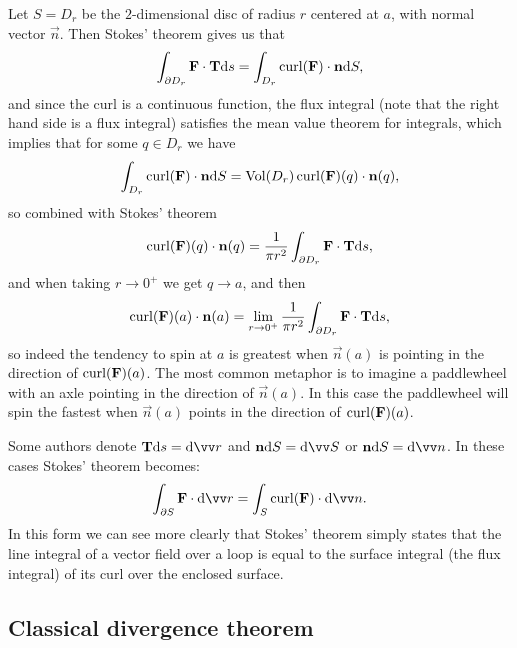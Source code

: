 \documentclass[11pt,a4paper]{article}
\begin{document}
\begin{example}
  Let $S = D_r$ be the $2$-dimensional disc of radius $r$ centered
  at $a$, with normal vector $\vec n$.
  Then Stokes' theorem gives us that
  \[
    \int_{\partial D_r} \boldsymbol{\mathbf{F}} \cdot \boldsymbol{\mathbf{T}} \mathrm{d} s =
    \int_{D_r} \operatorname{curl}(\boldsymbol{\mathbf{F}}) \cdot \boldsymbol{\mathbf{n}} \mathrm{d} S,
  \]
  and since the curl is a continuous function,
  the flux integral (note that the right hand side is a flux integral)
  satisfies the mean value theorem for integrals,
  which implies that for some $q \in D_r$ we have
  \[
    \int_{D_r} \operatorname{curl}(\boldsymbol{\mathbf{F}}) \cdot \boldsymbol{\mathbf{n}} \mathrm{d} S =
    \operatorname{Vol}(D_r) \operatorname{curl}(\boldsymbol{\mathbf{F}})(q) \cdot \boldsymbol{\mathbf{n}}(q),
  \]
  so combined with Stokes' theorem
  \[
    \operatorname{curl}(\boldsymbol{\mathbf{F}})(q) \cdot \boldsymbol{\mathbf{n}}(q) =
    \frac{1}{\pi r^2} \int_{\partial D_r} \boldsymbol{\mathbf{F}} \cdot \boldsymbol{\mathbf{T}} \mathrm{d} s,
  \]
  and when taking $r \to 0^+$ we get $q \to a$, and then
  \[
    \operatorname{curl}(\boldsymbol{\mathbf{F}})(a) \cdot \boldsymbol{\mathbf{n}}(a) =
    \lim_{r \to 0^+}
    \frac{1}{\pi r^2} \int_{\partial D_r} \boldsymbol{\mathbf{F}} \cdot \boldsymbol{\mathbf{T}} \mathrm{d} s,
  \]
  so indeed the tendency to spin at $a$ is greatest when $\vec n(a)$
  is pointing in the direction of $\operatorname{curl}(\boldsymbol{\mathbf{F}})(a)$.
  The most common metaphor is to imagine a paddlewheel with an axle
  pointing in the direction of $\vec n(a)$.
  In this case the paddlewheel will spin the fastest when $\vec n(a)$
  points in the direction of $\operatorname{curl}(\boldsymbol{\mathbf{F}})(a)$.
\end{example}

\begin{remark}
  Some authors denote $\vec T \ds = \dif \vv r$ and
  $\vec n \dS = \dif \vv S$ or $\vec n \dS = \dif \vv n$.
  In these cases Stokes' theorem becomes:
  \[
    \int_{\partial S} \vec F \cdot \dif \vv r =
    \int_{S} \curl(\vec F) \cdot \dif \vv n.
  \]
  In this form we can see more clearly that Stokes' theorem simply states
  that the line integral of a vector field over a loop
  is equal to the surface integral (the flux integral)
  of its curl over the enclosed surface.
\end{remark}

\subsection{Classical divergence theorem}
\end{document}
